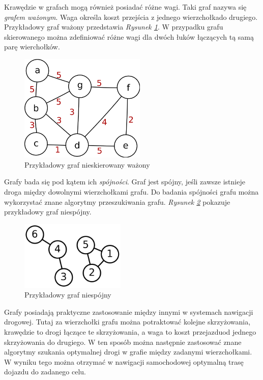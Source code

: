 \documentclass{article}
\begin{document}
\newpage
Krawędzie w grafach mogą również posiadać różne wagi. Taki graf nazywa się \emph{grafem ważonym}. Waga określa koszt przejścia z jednego wierzchołka\linebreak do drugiego. Przykładowy graf ważony przedstawia \emph{Rysunek \ref{fig:weight_graph}}. W przypadku grafu skierowanego można zdefiniować różne wagi dla dwóch łuków łączących tą samą parę wierchołków.

\begin{figure}[htp]
    \centering
    \includegraphics[width=6cm]{images/graph_weights.png}
    \caption{Przykładowy graf nieskierowany ważony}
    \label{fig:weight_graph}
\end{figure}

Grafy bada się pod kątem ich \emph{spójności}. Graf jest spójny, jeśli zawsze istnieje droga między dowolnymi wierzchołkami grafu. Do badania spójności grafu można wykorzystać znane algorytmy przeszukiwania grafu. \emph{Rysunek \ref{fig:inconsistent_graph}} pokazuje przykładowy graf niespójny.

\begin{figure}[htp]
    \centering
    \includegraphics[width=5cm]{images/graph_inconsistent.png}
    \caption{Przykładowy graf niespójny}
    \label{fig:inconsistent_graph}
\end{figure}

Grafy posiadają praktyczne zastosowanie między innymi w systemach nawigacji drogowej. Tutaj za wierzchołki grafu można potraktować kolejne skrzyżowania, krawędzie to drogi łączące te skrzyżowania, a waga to koszt przejazdu\linebreak od jednego skrzyżowania do drugiego. W ten sposób można następnie zastosować znane algorytmy szukania optymalnej drogi w grafie między zadanymi wierzchołkami. W wyniku tego można otrzymać w nawigacji samochodowej optymalną trasę dojazdu do zadanego celu.
\end{document}
